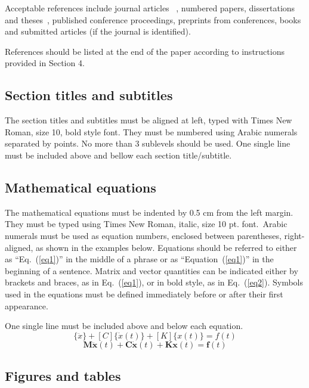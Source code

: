 \documentclass[10pt,fleqn,a4paper,twoside]{article}
\begin{document}
Acceptable references include journal articles ~\citep{MLA04}, numbered papers, dissertations and theses~\citep{CavaliniJunior2013,coelho2017}, published conference proceedings, preprints from conferences, books~\citep{McConnell.Varoto.2008} and submitted articles (if the journal is identified).

References should be listed at the end of the paper according to instructions provided in Section 4.

\subsection{Section titles and subtitles}

The section titles and subtitles must be aligned at left, typed with Times New Roman, size 10, bold style font. They must be numbered using Arabic numerals separated by points. No more than 3 sublevels should be used. One single line must be included above and bellow each section title/subtitle.

\subsection{Mathematical equations}

The mathematical equations must be indented by 0.5 cm from the left margin. They must be typed using Times New Roman, italic, size 10 pt. font.\ Arabic numerals must be used as equation numbers, enclosed between parentheses, right-aligned, as shown in the examples below. Equations should be referred to either as ``Eq.~(\ref{eq1})'' in the middle of a phrase or as ``Equation~(\ref{eq1})'' in the beginning of a sentence. Matrix and vector quantities can be indicated either by brackets and braces, as in Eq.~(\ref{eq1}), or in bold style, as in Eq.~(\ref{eq2}). Symbols used in the equations must be defined immediately before or after their first appearance.

One single line must be included above and below each equation.
\begin{equation}
[M]\{\ddot{x}\}+[C]\{\dot{x}(t)\}+[K]\{x(t)\}={f(t)} 
\label{eq1}
\end{equation}
\begin{equation}
\mathbf{M\ddot{x}}(t)+\mathbf{C\dot{x}}(t)+\mathbf{Kx}(t)=\mathbf{f}(t) 
\label{eq2}
\end{equation}

\subsection{Figures and tables}
\end{document}
